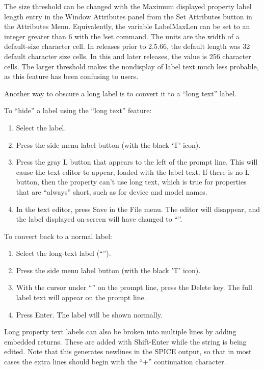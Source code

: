 The size threshold can be changed with the {\cb Maximum displayed
property label length} entry in the {\cb Window Attributes} panel from
the {\cb Set Attributes} button in the {\cb Attributes Menu}. 
Equivalently, the variable {\et LabelMaxLen} can be set to an
integer greater than 6 with the {\cb !set} command.  The units are the
width of a default-size character cell.  In releases prior to 2.5.66,
the default length was 32 default character size cells.  In this and
later releases, the value is 256 character cells.  The larger
threshold makes the nondisplay of label text much less probable, as
this feature has been confusing to users.

Another way to obscure a long label is to convert it to a ``long
text'' label.

To ``hide'' a label using the ``long text'' feature:
\begin{enumerate}
\item{Select the label.}
\item{Press the side menu {\cb label} button (with the black `T' icon).}
\item{Press the gray {\cb L} button that appears to the left of
 the prompt line.  This will cause the text editor to appear,
 loaded with the label text.  If there is no {\cb L} button, then
 the property can't use long text, which is true for properties
 that are ``always'' short, such as for device and model names.}
\item{In the text editor, press {\cb Save} in the {\cb File} menu.
 The editor will disappear, and the label displayed on-screen will
 have changed to ``{\vt [text]}''.}
\end{enumerate}

To convert back to a normal label:
\begin{enumerate}
\item{Select the long-text label (``{\vt [text]}'').}
\item{Press the side menu {\cb label} button (with the black 'T' icon).}
\item{With the cursor under ``{\vt [text]}'' on the prompt line, press
 the {\kb Delete} key.  The full label text will appear on the prompt
 line.}
\item{Press {\kb Enter}.  The label will be shown normally.}
\end{enumerate}

Long property text labels can also be broken into multiple lines by
adding embedded returns.  These are added with {\kb Shift-Enter} while
the string is being edited.  Note that this generates newlines in the
SPICE output, so that in most cases the extra lines should begin with
the ``+'' continuation character.


